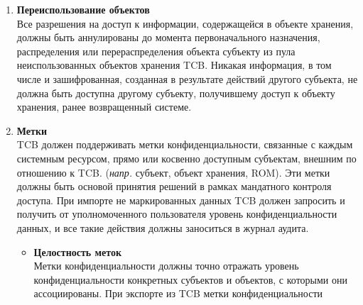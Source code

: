 \begin{enumerate}
\begin{enumerate}
\begin{enumerate}
\begin{enumerate}
                (\textit{напр.} ACL) должны позволять пользователям определять и контролировать общий доступ к объектам именованными субъектами и/или определенной группой субъектов и обеспечивать
                контроль ограничения распространения прав доступа. Механизм дискреционного контроля доступа должен либо путем явного действия пользователя, либо по умолчанию обеспечивать защиту
                объектов от несанкционированного доступа. Средства управления доступом должны позволять определять для каждого именованного объекта список именованных субъектов и список групп
                именованных субъектов с их соответствующими режимами доступа к этому объекту. Кроме того, для каждого такого именованного объекта должна быть возможность указать список
                именованных субъектов и список групп именованных субъектов, для которых доступ к объекту не должен быть предоставлен. Право на доступ к объекту пользователям, не имеющим
                данного права, должно назначаться только авторизованным пользователем.
                \item{\textbf{Переиспользование объектов}}\\
                Все разрешения на доступ к информации, содержащейся в объекте хранения, должны быть аннулированы до момента первоначального назначения, распределения или перераспределения объекта
                субъекту из пула неиспользованных объектов хранения TCB. Никакая информация, в том числе и зашифрованная, созданная в результате действий другого субъекта, не должна быть доступна
                другому субъекту, получившему доступ к объекту хранения, ранее возвращенный системе.
                \item{\textbf{Метки}}\\
                TCB должен поддерживать метки конфиденциальности, связанные с каждым системным ресурсом, прямо или косвенно доступным субъектам, внешним по отношению к TCB. (\textit{напр.} субъект,
                объект хранения, ROM). Эти метки должны быть основой принятия решений в рамках мандатного контроля доступа. При импорте не маркированных данных TCB должен запросить и получить от
                уполномоченного пользователя уровень конфиденциальности данных, и все такие действия должны заноситься в журнал аудита.
                \begin{itemize}
                    \item{\textbf{Целостность меток}}\\
                    Метки конфиденциальности должны точно отражать уровень конфиденциальности конкретных субъектов и объектов, с которыми они ассоциированы. При экспорте из TCB метки конфиденциальности

\end{itemize}
\end{enumerate}
\end{enumerate}
\end{enumerate}
\end{enumerate}
